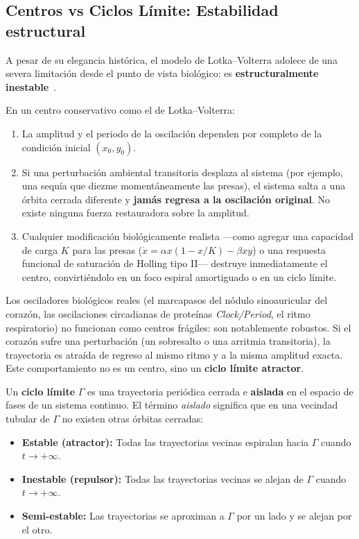 \subsection{Centros vs Ciclos Límite: Estabilidad estructural}

A pesar de su elegancia histórica, el modelo de Lotka--Volterra adolece de una severa limitación desde el punto de vista biológico: es \textbf{estructuralmente inestable}~\cite{strogatz2015,murray2002}.

En un centro conservativo como el de Lotka--Volterra:
\begin{enumerate}
    \item La amplitud y el periodo de la oscilación dependen por completo de la condición inicial $(x_0, y_0)$.
    \item Si una perturbación ambiental transitoria desplaza al sistema (por ejemplo, una sequía que diezme momentáneamente las presas), el sistema salta a una órbita cerrada diferente y \textbf{jamás regresa a la oscilación original}. No existe ninguna fuerza restauradora sobre la amplitud.
    \item Cualquier modificación biológicamente realista ---como agregar una capacidad de carga $K$ para las presas ($\dot{x} = \alpha x (1 - x/K) - \beta x y$) o una respuesta funcional de saturación de Holling tipo II--- destruye inmediatamente el centro, convirtiéndolo en un foco espiral amortiguado o en un ciclo límite.
\end{enumerate}

Los osciladores biológicos reales (el marcapasos del nódulo sinoauricular del corazón, las oscilaciones circadianas de proteínas \emph{Clock/Period}, el ritmo respiratorio) no funcionan como centros frágiles: son notablemente robustos. Si el corazón sufre una perturbación (un sobresalto o una arritmia transitoria), la trayectoria es atraída de regreso al mismo ritmo y a la misma amplitud exacta. Este comportamiento no es un centro, sino un \textbf{ciclo límite atractor}.

\begin{definition}
Un \textbf{ciclo límite} $\Gamma$ es una trayectoria periódica cerrada e \textbf{aislada} en el espacio de fases de un sistema continuo. El término \emph{aislado} significa que en una vecindad tubular de $\Gamma$ no existen otras órbitas cerradas:
\begin{itemize}
    \item \textbf{Estable (atractor):} Todas las trayectorias vecinas espiralan hacia $\Gamma$ cuando $t \to +\infty$.
    \item \textbf{Inestable (repulsor):} Todas las trayectorias vecinas se alejan de $\Gamma$ cuando $t \to +\infty$.
    \item \textbf{Semi-estable:} Las trayectorias se aproximan a $\Gamma$ por un lado y se alejan por el otro.
\end{itemize}
\end{definition}

